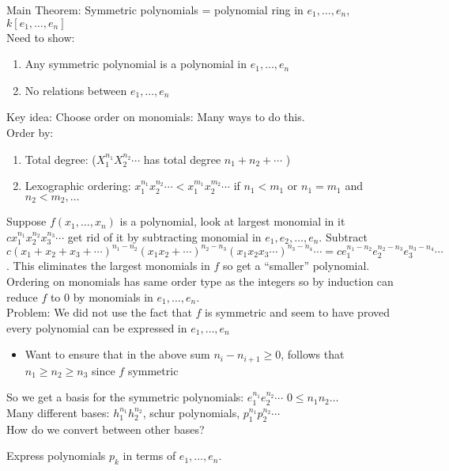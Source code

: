 \noindent
Main Theorem: Symmetric polynomials = polynomial ring in $e_1, \ldots, e_n$, $k[e_1, \ldots, e_n]$ \\
Need to show: 
\begin{enumerate}
    \item Any symmetric polynomial is a polynomial in $e_1, \ldots, e_n$ 
    \item No relations between $e_1, \ldots, e_n$ 
\end{enumerate}
Key idea: Choose order on monomials: Many ways to do this. \\
Order by: 
\begin{enumerate}
    \item Total degree: ($X_1^{n_1}X_2^{n_2} \cdots$ has total degree $n_1 + n_2 + \cdots$ ) 
    \item Lexographic ordering: $x_1^{n_1}x_2^{n_2} \cdots < x_1^{m_1} x_2^{m_2} \cdots$ if $n_1 < m_1$ or $n_1 = m_1$ and $n_2 < m_2, \ldots$ 
\end{enumerate}
Suppose $f(x_1, \ldots, x_n)$ is a polynomial, look at largest monomial in it $cx_1^{n_1} x_2^{n_2}x_3^{n_3} \cdots$ get rid of it by subtracting monomial in $e_1, e_2, \ldots, e_n$. Subtract $c(x_1 + x_2 + x_3 + \cdots)^{n_1-n_2} (x_1x_2 + \cdots)^{n_2-n_3}(x_1x_2x_3 \cdots)^{n_3 - n_4} \cdots = ce_1^{n_1 - n_2}e_2^{n_2 - n_3}e_3^{n_3  -n_4} \cdots$. This eliminates the largest monomials in $f$ so get a ``smaller'' polynomial. Ordering on monomials has same order type as the integers so by induction can reduce $f$ to 0 by monomials in $e_1, \ldots, e_n$. \\
Problem: We did not use the fact that $f$ is symmetric and seem to have proved every polynomial can be expressed in $e_1, \ldots, e_n$ 
\begin{itemize}
    \item Want to ensure that in the above sum $n_i - n_{i+1} \ge 0$, follows that $n_1 \ge n_2 \ge n_3$ since $f$ symmetric
\end{itemize}
So we get a basis for the symmetric polynomials: $e_1^{n_1}e_2^{n_2} \cdots$ $0 \le n_1 n_2 \ldots$ \\ 
Many different bases: $h_1^{n_1}h_2^{n_2}$, schur polynomials, $p_1^{n_1}p_2^{n_2}  \cdots$ \\
How do we convert between other bases? \\ 

\begin{example}
    Express polynomials $p_k$ in terms of $e_1, \ldots, e_n$.     
\end{example}